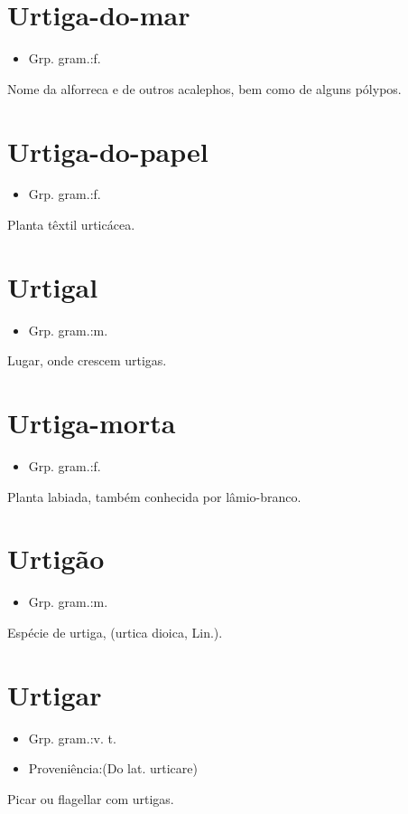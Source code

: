 \documentclass{article}
\begin{document}
\section{Urtiga-do-mar}
\begin{itemize}
\item {Grp. gram.:f.}
\end{itemize}
Nome da alforreca e de outros acalephos, bem como de alguns pólypos.
\section{Urtiga-do-papel}
\begin{itemize}
\item {Grp. gram.:f.}
\end{itemize}
Planta têxtil urticácea.
\section{Urtigal}
\begin{itemize}
\item {Grp. gram.:m.}
\end{itemize}
Lugar, onde crescem urtigas.
\section{Urtiga-morta}
\begin{itemize}
\item {Grp. gram.:f.}
\end{itemize}
Planta labiada, também conhecida por \textunderscore lâmio-branco\textunderscore .
\section{Urtigão}
\begin{itemize}
\item {Grp. gram.:m.}
\end{itemize}
Espécie de urtiga, (\textunderscore urtica dioica\textunderscore , Lin.).
\section{Urtigar}
\begin{itemize}
\item {Grp. gram.:v. t.}
\end{itemize}
\begin{itemize}
\item {Proveniência:(Do lat. \textunderscore urticare\textunderscore )}
\end{itemize}
Picar ou flagellar com urtigas.
\end{document}

